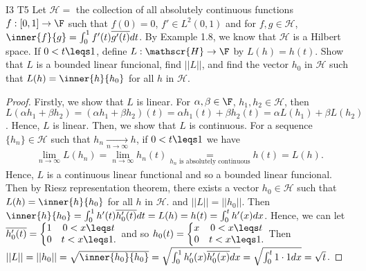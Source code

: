\begin{exercise}{I3 T5}{}
    Let $\mathscr{H}=$ the collection of all absolutely continuous functions $f:[0,1]\rightarrow \F$ such that $f(0)=0$, $f'\in L^2(0,1)$ 
    and for $f,g\in \mathscr{H}$, $\inner{f}{g}=\int_{0}^{1} f'(t)\overline{g'(t)}dt$. By Example 1.8, we know that $\mathscr{H}$ is a Hilbert space.
    If $0<t\leqs 1$, define $L:\mathscr{H}\rightarrow \F$ by $L(h)=h(t)$.
    Show that $L$ is a bounded linear funcional, find $||L||$, 
    and find the vector $h_0$ in $\mathscr{H}$ such that $L(h)=\inner{h}{h_0}$ for all $h$ in $\mathscr{H}$. 
\end{exercise}
\begin{proof}
    Firstly, we show that $L$ is linear.
    For $\alpha,\beta\in\F$, $h_1,h_2\in\mathscr{H}$, then $L(\alpha h_1+ \beta h_2)=(\alpha h_1+\beta h_2)(t)=\alpha h_1(t) +\beta h_2(t)=\alpha L(h_1)+\beta L(h_2)$.
    Hence, $L$ is linear. Then, we show that $L$ is continuous. For a sequence $\{h_n\}\in \mathscr{H}$ such that $h_n\underset{n\rightarrow \infty}{\longrightarrow} h$,
    if $0<t\leqs 1$ we have
    \begin{align*}
        \lim_{n\rightarrow \infty}L(h_n)=\lim_{n\rightarrow \infty}h_n(t)\underset{h_n \text{ is absolutely continuous}}{=} h(t)=L(h).
    \end{align*}
    Hence, $L$ is a continuous linear functional and so a bounded linear funcional.
    Then by Riesz representation theorem, there exists a vector $h_0\in \mathscr{H}$ such that $L(h)=\inner{h}{h_0}$ for all $h$ in $\mathscr{H}$.
    and $||L||=||h_0||$. Then $\inner{h}{h_0}=\int_{0}^{1}h'(t)\overline{h_0'(t)}dt=L(h)=h(t)=\int_{0}^{t}h'(x)dx$.
    Hence, we can let $\overline{h_0'(t)}=\left\{\begin{matrix}
        1& 0< x\leqs t \\
        0& t<x\leqs 1.
      \end{matrix}\right.$ 
      and so $h_0(t)=\left\{\begin{matrix}
        x& 0< x\leqs t \\
        0& t<x\leqs 1.
    \end{matrix}\right.$
    Then $||L||=||h_0||=\sqrt{\inner{h_0}{h_0}}=\sqrt{\int_{0}^{1}h_0'(x)\overline{h_0'(x)}dx}=\sqrt{\int_{0}^{t}1\cdot 1dx}=\sqrt{t}$.
\end{proof}

